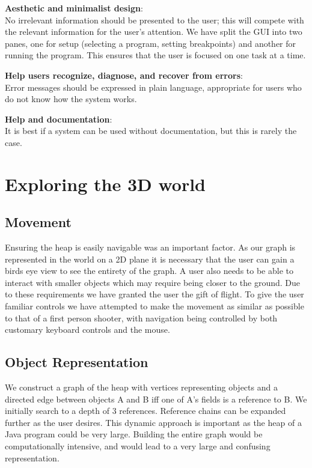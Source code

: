 \documentclass[11pt, a4paper]{report}
\begin{document}
{\bfseries Aesthetic and minimalist design}: \\
No irrelevant information should be presented to the user; this will compete with the relevant information for the user’s attention. We have split the GUI into two panes, one for setup (selecting a program, setting breakpoints) and another for running the program. This ensures that the user is focused on one task at a time.

{\bfseries Help users recognize, diagnose, and recover from errors}: \\
Error messages should be expressed in plain language, appropriate for users who do not know how the system works.

{\bfseries Help and documentation}: \\
It is best if a system can be used without documentation, but this is rarely the case.

\section{Exploring the 3D world}

\subsection{Movement}

Ensuring the heap is easily navigable was an important factor. As our graph is represented in the world on a 2D plane it is necessary that the user can gain a birds eye view to see the entirety of the graph. A user also needs to be able to interact with smaller objects which may require being closer to the ground. Due to these requirements we have granted the user the gift of flight. To give the user familiar controls we have attempted to make the movement as similar as possible to that of a first person shooter, with navigation being controlled by both customary keyboard controls and the mouse. 

\subsection{Object Representation}

We construct a graph of the heap with vertices representing objects and a directed edge between objects A and B iff one of A’s fields is a reference to B. We initially search to a depth of 3 references. Reference chains can be expanded further as the user desires. This dynamic approach is important as the heap of a Java program could be very large. Building the entire graph would be computationally intensive, and would lead to a very large and confusing representation.
\end{document}
